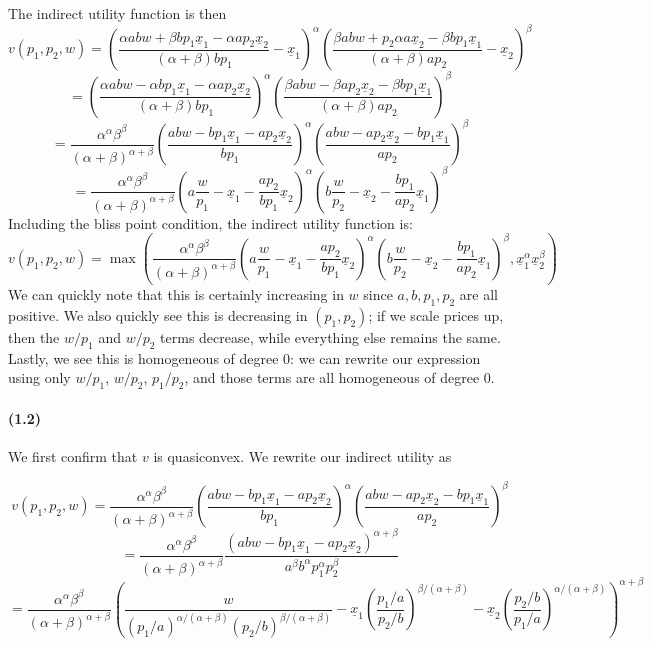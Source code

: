 \documentclass[10pt,letter]{article}
\begin{document}
The indirect utility function is then
\[ v(p_1, p_2, w) = \left(\frac{\alpha abw + \beta bp_1\underline{x}_1- \alpha ap_2 \underline{x}_2}{(\alpha + \beta) b p_1} - \underline{x}_1\right)^\alpha\left(\frac{\beta ab w + p_2 \alpha a\underline{x}_2 - \beta bp_1\underline{x}_1}{(\alpha+\beta) a p_2} - \underline{x}_2\right)^\beta \]
\[  = \left(\frac{\alpha abw - \alpha bp_1\underline{x}_1- \alpha ap_2 \underline{x}_2}{(\alpha + \beta) b p_1} \right)^\alpha\left(\frac{\beta ab w -\beta ap_2\underline{x}_2 - \beta bp_1\underline{x}_1}{(\alpha+\beta) a p_2} \right)^\beta \]
\[  = \frac{\alpha^\alpha \beta^\beta}{(\alpha+\beta)^{\alpha + \beta}}\left(\frac{abw - bp_1\underline{x}_1- ap_2 \underline{x}_2}{ b p_1} \right)^\alpha\left(\frac{ab w -ap_2\underline{x}_2 - bp_1\underline{x}_1}{a p_2} \right)^\beta \]
\[  = \frac{\alpha^\alpha \beta^\beta}{(\alpha+\beta)^{\alpha + \beta}}\left(a\frac{w}{p_1} - \underline{x}_1- \frac{ap_2}{bp_1} \underline{x}_2 \right)^\alpha\left(b \frac{w}{p_2} -\underline{x}_2 - \frac{bp_1}{ap_2}\underline{x}_1 \right)^\beta \]
Including the bliss point condition, the indirect utility function is:
\[  v(p_1, p_2, w) = \max\left( \frac{\alpha^\alpha \beta^\beta}{(\alpha+\beta)^{\alpha + \beta}}\left(a\frac{w}{p_1} - \underline{x}_1- \frac{ap_2}{bp_1} \underline{x}_2 \right)^\alpha\left(b \frac{w}{p_2} -\underline{x}_2 - \frac{bp_1}{ap_2}\underline{x}_1 \right)^\beta,\underline{x}_1^\alpha \underline{x}_2^\beta \right) \]
We can quickly note that this is certainly increasing in $w$ since $a, b, p_1, p_2$ are all positive. We also quickly see this is decreasing in $(p_1, p_2)$; if we scale prices up, then the $w/p_1$ and $w/p_2$ terms decrease, while everything else remains the same. Lastly, we see this is homogeneous of degree 0: we can rewrite our expression using only $w/p_1$, $w/p_2$, $p_1/p_2$, and those terms are all homogeneous of degree 0.

\paragraph{(1.2)}
We first confirm that $v$ is quasiconvex. We rewrite our indirect utility as

\[ v(p_1, p_2, w)  = \frac{\alpha^\alpha \beta^\beta}{(\alpha+\beta)^{\alpha + \beta}}\left(\frac{abw - bp_1\underline{x}_1- ap_2 \underline{x}_2}{ b p_1} \right)^\alpha\left(\frac{ab w -ap_2\underline{x}_2 - bp_1\underline{x}_1}{a p_2} \right)^\beta \]
\[ = \frac{\alpha^\alpha \beta^\beta}{(\alpha+\beta)^{\alpha + \beta}}\frac{(abw - bp_1\underline{x}_1- ap_2 \underline{x}_2)^{\alpha + \beta}}{ a^\beta b^\alpha p_1^\alpha p_2^\beta}  \]
\[ = \frac{\alpha^\alpha \beta^\beta}{(\alpha+\beta)^{\alpha + \beta}}\left(\frac{w}{(p_1/a)^{\alpha/(\alpha+\beta)}(p_2/b)^{\beta/(\alpha+\beta)}} - \underline{x}_1\left(\frac{p_1/a}{p_2/b}\right)^{\beta/(\alpha+\beta)}- \underline{x}_2 \left(\frac{p_2/b}{p_1/a}\right)^{\alpha/(\alpha+\beta)} \right)^{\alpha + \beta}  \]
\end{document}
